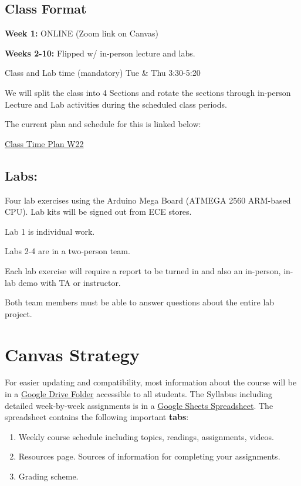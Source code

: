 
\subsection{Class Format } 
{\bf Week 1: } ONLINE (Zoom link on Canvas)

\noindent
{\bf Weeks 2-10: }  Flipped w/ in-person lecture and labs.

Class and Lab time (mandatory)
Tue \& Thu 3:30-5:20 

We will split the class into 4 Sections and rotate the sections through in-person Lecture and Lab activities 
during the scheduled class periods. 

The current plan and schedule for this is linked below:

\href{https://docs.google.com/document/d/1A8oC3ewd6Q8TIoT6QboHHqFP_86O5W6CQmI3ssmzw74/edit}{Class Time Plan W22}


\subsection{Labs: }

Four lab exercises using the Arduino Mega Board (ATMEGA 2560 ARM-based CPU).   Lab kits will be signed out from
ECE stores.

Lab 1 is individual work.

Labs 2-4 are in a two-person team. 

Each lab exercise will require a report to be turned in and also an in-person, in-lab demo with TA or instructor.

Both team members must be able to answer questions about the entire lab project. 



\section{Canvas Strategy}
For easier updating and compatibility, most information about the course will be in a 
\href{https://drive.google.com/drive/u/1/folders/1fiYQZ4aIYyq9MIifMRhXioKQF0ENuCZ5}{Google Drive Folder} 
accessible to all students.   The Syllabus including detailed week-by-week 
assignments is in a 
\href{https://docs.google.com/spreadsheets/d/1pLo5GvlvPP_WHET6sbK7IhZyR_x2ABR-7OutT0kR_mc/edit?usp=sharing} {Google Sheets Spreadsheet}.   
The spreadsheet contains the following important {\bf tabs}:
\begin{enumerate}
    \item Weekly course schedule including topics, readings, assignments, videos.
    \item Resources page.  Sources of information for completing your assignments.
    \item Grading scheme. 
\end{enumerate}
 
